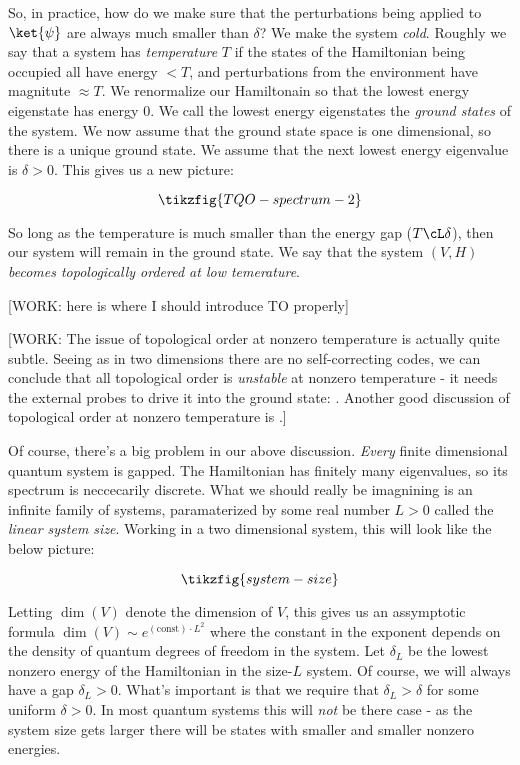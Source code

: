 So, in practice, how do we make sure that the perturbations being applied to $\ket{\psi}$ are always much smaller than $\delta$? We make the system \textit{cold}. Roughly we say that a system has \textit{temperature} $T$ if the states of the Hamiltonian being occupied all have energy $<T$, and perturbations from the environment have magnitute $\approx T$. We renormalize our Hamiltonain so that the lowest energy eigenstate has energy $0$. We call the lowest energy eigenstates the \textit{ground states} of the system. We now assume that the ground state space is one dimensional, so there is a unique ground state. We assume that the next lowest energy eigenvalue is $\delta>0$. This gives us a new picture:

\begin{equation*}
\tikzfig{TQO-spectrum-2}
\end{equation*}

So long as the temperature is much smaller than the energy gap ($T\cL \delta$), then our system will remain in the ground state. We say that the system $(V,H)$ \textit{becomes topologically ordered at low temerature}. 

[WORK: here is where I should introduce TO properly]

[WORK: The issue of topological order at nonzero temperature is actually quite subtle. Seeing as in two dimensions there are no self-correcting codes, we can conclude that all topological order is \textit{unstable} at nonzero temperature - it needs the external probes to drive it into the ground state: \cite{hastings2011topological}. Another good discussion of topological order at nonzero temperature is \cite{nussinov2009symmetry}.]

Of course, there's a big problem in our above discussion. \textit{Every} finite dimensional quantum system is gapped. The Hamiltonian has finitely many eigenvalues, so its spectrum is neccecarily discrete. What we should really be imagnining is an infinite family of systems, paramaterized by some real number $L>0$ called the \textit{linear system size}. Working in a two dimensional system, this will look like the below picture:

\begin{equation*}
\tikzfig{system-size}
\end{equation*}

Letting $\dim(V)$ denote the dimension of $V$, this gives us an assymptotic formula $\dim(V)\sim e^{(\text{const})\cdot L^2}$ where the constant in the exponent depends on the density of quantum degrees of freedom in the system. Let $\delta_L$ be the lowest nonzero energy of the Hamiltonian in the size-$L$ system. Of course, we will always have a gap $\delta_L>0$. What's important is that we require that $\delta_L>\delta$ for some uniform $\delta>0$. In most quantum systems this will \textit{not} be there case - as the system size gets larger there will be states with smaller and smaller nonzero energies.


